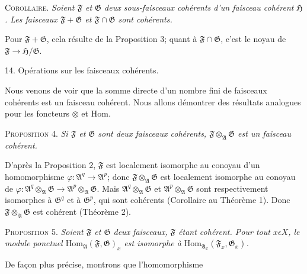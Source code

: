 \textsc{Corollaire}. \emph{Soient $\mathfrak{F}$ et $\mathfrak{G}$ deux sous-faisceaux cohérents d'un faisceau cohérent $\mathfrak{H}$. Les faisceaux $\mathfrak{F} + \mathfrak{G}$ et $\mathfrak{F} \cap \mathfrak{G}$ sont cohérents.}

Pour $\mathfrak{F} + \mathfrak{G}$, cela résulte de la Proposition 3; quant à $\mathfrak{F} \cap \mathfrak{G}$, c'est le noyau de $\mathfrak{F} \to \mathfrak{H}/\mathfrak{G}$.


14. Opérations sur les faisceaux cohérents.

Nous venons de voir que la somme directe d'un nombre fini de faisceaux cohérents est un faisceau cohérent. Nous allons démontrer des résultats analogues pour les foncteurs $\otimes$ et $\mathrm{Hom}$.

\textsc{Proposition} 4. \emph{Si $\mathfrak{F}$ et $\mathfrak{G}$ sont deux faisceaux cohérents, $\mathfrak{F} \otimes_{\mathfrak{A}} \mathfrak{G}$ est un faisceau cohérent.}

D'après la Proposition 2, $\mathfrak{F}$ est localement isomorphe au conoyau d'un homomorphisme $\varphi: \mathfrak{A}^q \to \mathfrak{A}^p$; donc $\mathfrak{F} \otimes_{\mathfrak{A}} \mathfrak{G}$ est localement isomorphe au conoyau de $\varphi: \mathfrak{A}^q \otimes_{\mathfrak{A}} \mathfrak{G} \to \mathfrak{A}^p \otimes_{\mathfrak{A}} \mathfrak{G}$. Mais $\mathfrak{A}^q \otimes_{\mathfrak{A}} \mathfrak{G}$ et $\mathfrak{A}^p \otimes_{\mathfrak{A}} \mathfrak{G}$ sont respectivement isomorphes à $\mathfrak{G}^q$ et à $\mathfrak{G}^p$, qui sont cohérents (Corollaire au Théorème 1). Donc $\mathfrak{F} \otimes_{\mathfrak{A}} \mathfrak{G}$ est cohérent (Théorème 2).

\textsc{Proposition} 5. \emph{Soient $\mathfrak{F}$ et $\mathfrak{G}$ deux faisceaux, $\mathfrak{F}$ étant cohérent. Pour tout $x \epsilon X$, le module ponctuel $\mathrm{Hom}_{\mathfrak{A}}(\mathfrak{F}, \mathfrak{G})_x$ est isomorphe à $\mathrm{Hom}_{\mathfrak{A}_x}(\mathfrak{F}_x, \mathfrak{G}_x)$.}

De façon plus précise, montrons que l'homomorphisme

